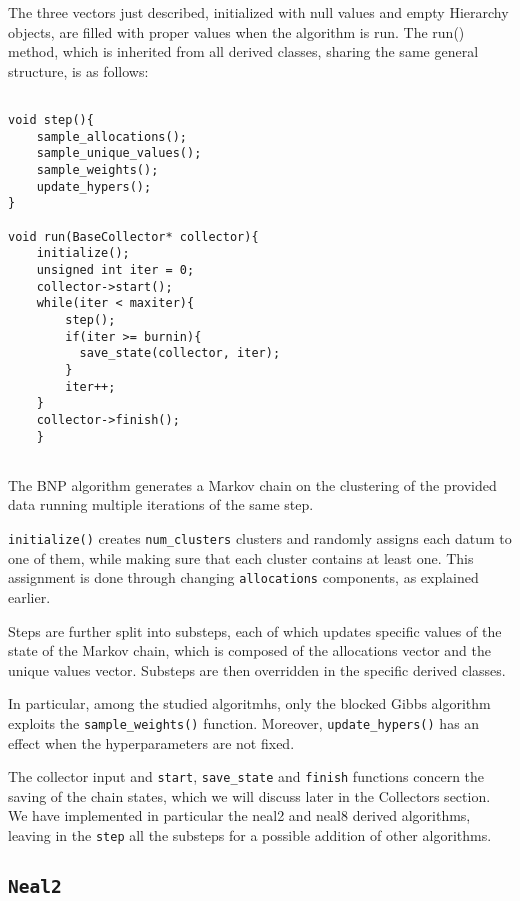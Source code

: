 The three vectors just described, initialized with null values and empty Hierarchy objects, are filled with proper values when the algorithm is run.
The run() method, which is inherited from all derived classes, sharing the same general structure, is as follows:

\begin{verbatim}

void step(){
    sample_allocations();
    sample_unique_values();
    sample_weights();
    update_hypers();
}

void run(BaseCollector* collector){
    initialize();
    unsigned int iter = 0;
    collector->start();
    while(iter < maxiter){
        step();
        if(iter >= burnin){
          save_state(collector, iter);
        }
        iter++;
    }
    collector->finish();
    }
    
\end{verbatim}

The BNP algorithm generates a Markov chain on the clustering of the provided data running multiple iterations of the same step.

\verb|initialize()| creates \verb|num_clusters| clusters and randomly assigns each datum to one of them, while making sure that each cluster contains at least one.
	This assignment is done through changing \verb|allocations| components, as explained earlier.

Steps are further split into substeps, each of which updates specific values of the state of the Markov chain, which is composed of the allocations vector and the unique values vector. Substeps are then overridden in the specific derived classes.

In particular, among the studied algoritmhs, only the blocked Gibbs algorithm exploits the \verb|sample_weights()| function. Moreover, \verb|update_hypers()| has an effect  when the hyperparameters are not fixed.

The collector input and \verb|start|, \verb|save_state| and \verb|finish| functions concern the saving of the chain states, which we will discuss later in the Collectors section.
We have implemented in particular the neal2 and neal8 derived algorithms, leaving in the \verb|step| all the substeps for a possible addition of other algorithms.




\subsection{\texttt{Neal2}}

